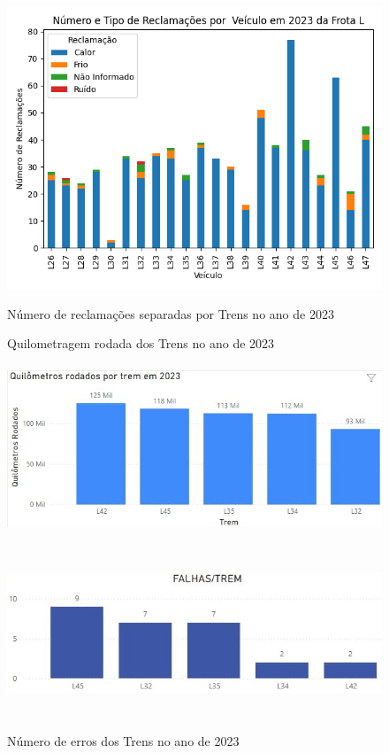 \documentclass[acronym,symbols,table]{fei}
\begin{document}
\begin{figure}[!htb]
    \centering
    \caption{Número de reclamações separadas por Trens no ano de 2023}
    \includegraphics[width=0.8\linewidth]{Imagens/reclamacao_trem.png}
    \label{fig:reclamacao_trem}
\end{figure}

\begin{figure}[!htb]
	\centering
	\begin{minipage}{0.4\textwidth}
		\caption{Quilometragem rodada dos Trens no ano de 2023}
		\includegraphics[width=\linewidth, height=5cm]{Imagens/Quilometros.jpeg}
		\label{fig:quilometros}
	\end{minipage}\hfill
	\begin{minipage}{0.5\textwidth}
		\caption{Número de erros dos Trens no ano de 2023}
		\includegraphics[width=\linewidth, height=5cm]{Imagens/erros.jpeg}
		\label{fig:erros}
	\end{minipage}
\end{figure}
\end{document}

